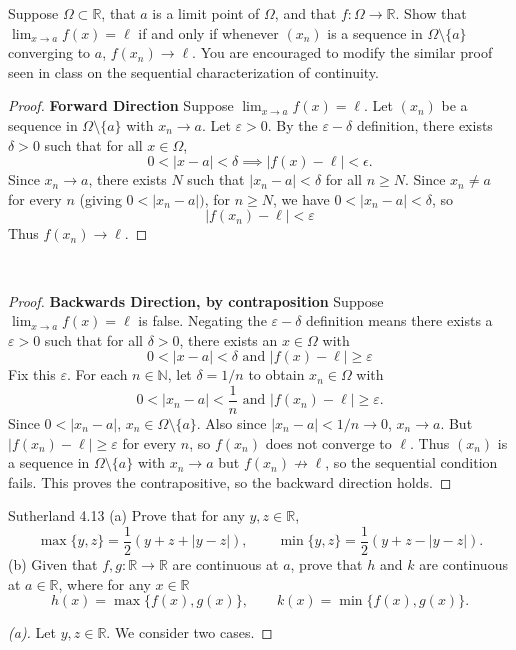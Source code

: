 \documentclass[minion]{homework}
\newcommand{\Reals}{\ensuremath{\mathbb R}}%
\newcommand{\Nats}{\ensuremath{\mathbb N}} %
\begin{document}
\begin{problems}
\problem Suppose $\Omega\subset\Reals$, that $a$ is a limit point of $\Omega$, 
and that $f:\Omega\to\Reals$.  Show that $\lim_{x\to a}f(x) =\ell$ if
and only if whenever $(x_n)$ is a sequence in $\Omega\setminus\{a\}$ converging to $a$,
$f(x_n) \to \ell$.  You are encouraged to modify the similar proof seen in 
class on the sequential characterization of continuity.
\newline
\begin{proof} \textbf{Forward Direction} \newline
  Suppose $\lim_{x \to a} f(x) = \ell$. Let $(x_n)$ be a sequence in $\Omega \setminus \{a\}$ with $x_n \to a$. Let $\varepsilon > 0$. By the $\varepsilon-\delta$ definition, there exists $\delta > 0$ such that for all $x \in \Omega$,
  $$0 < |x - a| < \delta \implies |f(x) - \ell| < \epsilon.$$
  Since $x_n \to a$, there exists $N$ such that $|x_n - a| < \delta$ for all $n \geq N$. Since $x_n \neq a$ for every $n$ (giving $0 < |x_n - a|)$, for $n \geq N$, we have $0 < |x_n - a| < \delta$, so
  $$|f(x_n)-\ell| < \varepsilon$$
  Thus $f(x_n) \to \ell$.
\end{proof}$ $
\begin{proof} \textbf{Backwards Direction, by contraposition}
  Suppose $\lim_{x \to a} f(x) = \ell$ is false. Negating the $\varepsilon-\delta$ definition means there exists a $\varepsilon > 0$ such that
  for all $\delta > 0$, there exists an $x \in \Omega$ with
  $$0 < |x - a| < \delta \text{ and } |f(x) - \ell| \geq \varepsilon$$
  Fix this $\varepsilon$. For each $n \in \Nats$, let $\delta = 1/n$ to obtain $x_n \in \Omega$ with
  $$ 0 < |x_n - a| < \frac{1}{n} \text{  and  } |f(x_n) - \ell| \geq \varepsilon.$$
  Since $0 < |x_n - a|$, $x_n \in \Omega \setminus \{a\}$. Also since $|x_n - a| < 1/n \to 0$, $x_n \to a$. But $|f(x_n) - \ell| \geq \varepsilon$ for every $n$, so $f(x_n)$ does not converge to $\ell$.
  Thus $(x_n)$ is a sequence in $\Omega \setminus \{a\}$ with $x_n \to a$ but $f(x_n) \not\to \ell$, so the sequential condition fails. This proves the contrapositive, so the backward direction holds.
\end{proof}
\problem Sutherland 4.13 \newline
(a) Prove that for any $y,z\in\Reals$,
\[
\max\{y,z\} = \frac12(y+z+|y-z|), \qquad \min\{y,z\} = \frac12(y+z-|y-z|).
\]
(b) Given that $f,g:\Reals\to\Reals$ are continuous at $a$, prove that $h$ and $k$ are
continuous at $a\in\Reals$, where for any $x\in\Reals$
\[
h(x)=\max\{f(x),g(x)\}, \qquad k(x)=\min\{f(x),g(x)\}.
\]
\newline
\begin{proof}[(a)]
  Let $y,z\in\Reals$. We consider two cases.


\end{proof}
\end{problems}
\end{document}
